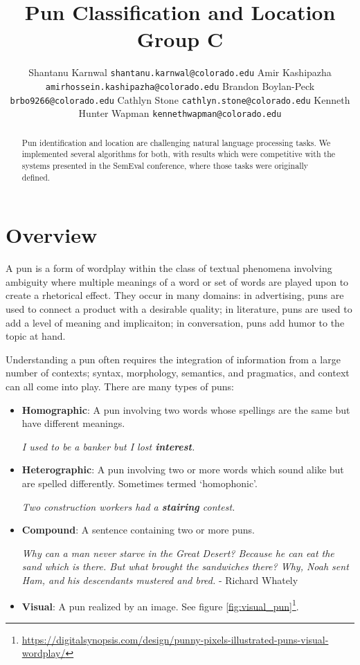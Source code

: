 \documentclass{article}
\title{Pun Classification and Location\\Group C}
\author{Shantanu Karnwal \texttt{shantanu.karnwal@colorado.edu}
	\And Amir Kashipazha \texttt{amirhossein.kashipazha@colorado.edu}
	\And Brandon Boylan-Peck \texttt{brbo9266@colorado.edu}
	\And Cathlyn Stone \texttt{cathlyn.stone@colorado.edu}
	\And Kenneth Hunter Wapman \texttt{kennethwapman@colorado.edu}
}
\begin{document}
\maketitle

\begin{abstract}
	Pun identification and location are challenging natural language processing 
	tasks. We implemented several algorithms for both, with results which 
	were competitive with the systems presented in the SemEval conference, where
	those tasks were originally defined.
\end{abstract}


\section{Overview}
A pun is a form of wordplay within the class of textual phenomena involving
ambiguity where multiple meanings of a word or set of words are played upon to
create a rhetorical effect. They occur in many domains: in advertising, puns
are used to connect a product with a desirable quality; in literature, puns are
used to add a level of meaning and implicaiton; in conversation, puns add humor
to the topic at hand.

Understanding a pun often requires the integration of information from a large
number of contexts; syntax, morphology, semantics, and pragmatics, and context
can all come into play. There are many types of puns:

\begin{itemize}
	\item{\textbf{Homographic}: A pun involving two words whose spellings are
		the same but have different meanings.
		\begin{center}
		\emph{I used to be a banker but I lost \textbf{interest}.}
		\end{center}
	}
	\item{\textbf{Heterographic}: A pun involving two or more words which sound
		alike but are spelled differently. Sometimes termed `homophonic'.
		\begin{center}
		\emph{Two construction workers had a \textbf{stairing} contest.}
		\end{center}
	}
	\item{\textbf{Compound}: A sentence containing two or more puns.
		\begin{center}
		\emph{Why can a man never starve in the Great Desert? Because he can
		eat the sand which is there. But what brought the sandwiches there?
		Why, Noah sent Ham, and his descendants mustered and bred.} - Richard Whately
		\end{center}
	}
	\item{\textbf{Visual}: A pun realized by an image. See figure \ref{fig:visual_pun}\footnote{\url{https://digitalsynopsis.com/design/punny-pixels-illustrated-puns-visual-wordplay/}}.
	}
\end{itemize}
\end{document}
